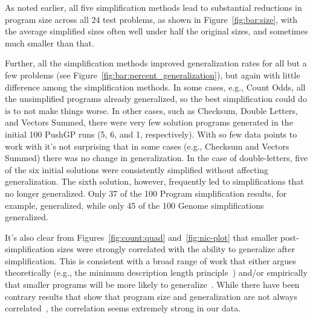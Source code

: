 As noted earlier, all five simplification methods lead to substantial
reductions in program size across all 24 test problems, as shown in
Figure~\ref{fig:bar:size}, with the average simplified sizes often 
well under half the original sizes, and sometimes much smaller than that.

Further, all the simplification methods improved generalization rates for
all but a few problems (see Figure~\ref{fig:bar:percent_generalization}),
but again with little difference among the simplification methods.
In some cases, e.g., Count Odds, all the unsimplified programs already
generalized, so the best simplification could do is to not make things
worse. In other cases, such as
Checksum, Double Letters, and Vectors Summed, there were very few 
solution programs generated in the initial 100 PushGP runs (5, 6, and 1,
respectively). With so few data points to work with it's not surprising
that in some cases (e.g., Checksum and Vectors Summed) there was no change
in generalization. In the case of double-letters, five of the six initial
solutions were consistently simplified without affecting generalization.
The sixth solution, however, frequently led to simplifications that no 
longer generalized. Only 37 of the 100 Program simplification results, 
for example, generalized, while only 45 of the 100 Genome simplifications
generalized.


It's also clear from Figures~\ref{fig:count:quad} and~\ref{fig:nic-plot} that
smaller post-simplification sizes were strongly correlated with the
ability to generalize after simplification. This is consistent with 
a broad range of work that either argues theoretically (e.g., the minimum
description length principle~\cite{iba1994genetic, zhang1995balancing}) 
and/or empirically
that smaller programs will be more likely to generalize~\cite{thing1, thing2}.
While there have been contrary results that show that program size and
generalization are not always correlated~\cite{silva2012operator}, the
correlation seems extremely strong in our data. 


